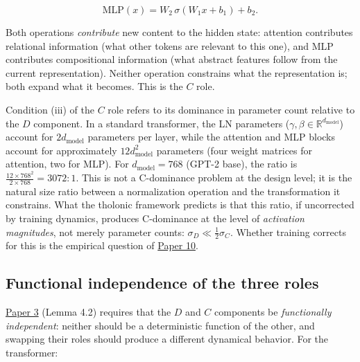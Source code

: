 \documentclass[12pt]{article}
\begin{document}
\[\text{MLP}(x) = W_2\,\sigma(W_1 x + b_1) + b_2.\]

Both operations \emph{contribute} new content to the hidden state:
attention contributes relational information (what other tokens are
relevant to this one), and MLP contributes compositional information
(what abstract features follow from the current representation). Neither
operation constrains what the representation is; both expand what it
becomes. This is the \(C\) role.

Condition (iii) of the \(C\) role refers to its dominance in parameter
count relative to the \(D\) component. In a standard transformer, the LN
parameters (\(\gamma, \beta \in \mathbb{R}^{d_\text{model}}\)) account
for \(2d_\text{model}\) parameters per layer, while the attention and
MLP blocks account for approximately \(12d_\text{model}^2\) parameters
(four weight matrices for attention, two for MLP). For
\(d_\text{model} = 768\) (GPT-2 base), the ratio is
\(\frac{12 \times 768^2}{2 \times 768} = 3072 : 1\). This is not a
C-dominance problem at the design level; it is the natural size ratio
between a normalization operation and the transformation it constrains.
What the tholonic framework predicts is that this ratio, if uncorrected
by training dynamics, produces C-dominance at the level of
\emph{activation magnitudes}, not merely parameter counts:
\(\sigma_D \ll \frac{1}{2}\sigma_C\). Whether training corrects for this
is the empirical question of
\href{https://github.com/baardev/truevalue/blob/main/docnav/Research/papers/10_tholonic-neural-architecture/10_tholonic-neural-architecture.pdf}{Paper
10}.

\subsection{Functional independence of the three roles}\label{functional-independence-of-the-three-roles}

\href{https://github.com/baardev/truevalue/blob/main/docnav/Research/papers/3_minimal-recursive-triadic-framework/3_minimal-recursive-triadic-framework.pdf}{Paper
3} (Lemma 4.2) requires that the \(D\) and \(C\) components be
\emph{functionally independent}: neither should be a deterministic
function of the other, and swapping their roles should produce a
different dynamical behavior. For the transformer:
\end{document}
